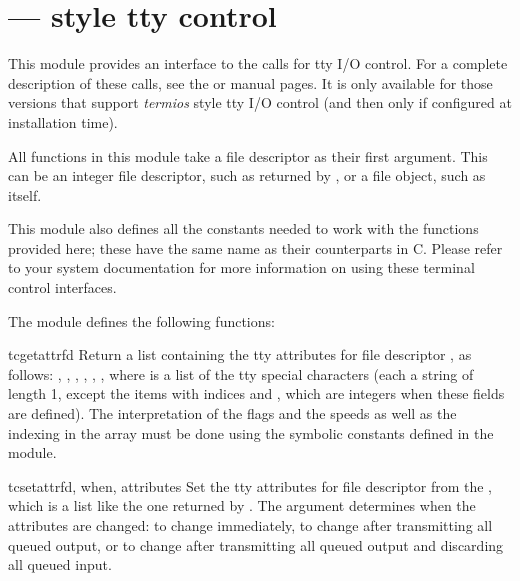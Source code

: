 \section{ ---
         \POSIX{} style tty control}




This module provides an interface to the \POSIX{} calls for tty I/O
control.  For a complete description of these calls, see the \POSIX{} or
\UNIX{} manual pages.  It is only available for those \UNIX{} versions
that support \POSIX{} \emph{termios} style tty I/O control (and then
only if configured at installation time).

All functions in this module take a file descriptor  as their
first argument.  This can be an integer file descriptor, such as
returned by , or a file object, such as
 itself.

This module also defines all the constants needed to work with the
functions provided here; these have the same name as their
counterparts in C.  Please refer to your system documentation for more
information on using these terminal control interfaces.

The module defines the following functions:

\begin{funcdesc}{tcgetattr}{fd}
Return a list containing the tty attributes for file descriptor
, as follows: \code{[}, , ,
, , , \code{]} where
 is a list of the tty special characters (each a string of
length 1, except the items with indices  and
, which are integers when these fields are
defined).  The interpretation of the flags and the speeds as well as
the indexing in the  array must be done using the symbolic
constants defined in the 
module.
\end{funcdesc}

\begin{funcdesc}{tcsetattr}{fd, when, attributes}
Set the tty attributes for file descriptor  from the
, which is a list like the one returned by
.  The  argument determines when the
attributes are changed:  to change immediately,
 to change after transmitting all queued output,
or  to change after transmitting all queued
output and discarding all queued input.
\end{funcdesc}

